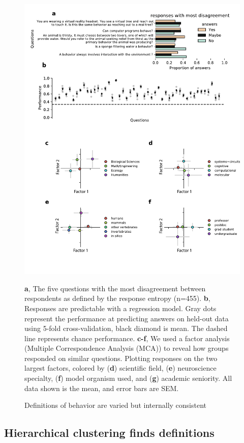 \documentclass[a4paper, 11pt]{article}
\begin{document}
\begin{figure}
\centerline{\includegraphics[width=\textwidth]{fig1.pdf}}
\caption{Definitions of behavior are varied but internally consistent} \textbf{a}, The five questions with the most disagreement between respondents as defined by the response entropy (n=455). \textbf{b}, Responses are predictable with a regression model. Gray dots represent the performance at predicting answers on held-out data using 5-fold cross-validation, black diamond is mean. The dashed line represents chance performance. \textbf{c-f}, We used a factor analysis (Multiple Correspondence Analysis (MCA)) to reveal how groups responded on similar questions. Plotting responses on the two largest factors, colored by (\textbf{d}) scientific field, (\textbf{e}) neuroscience specialty, (\textbf{f}) model organism used, and (\textbf{g}) academic seniority. All data shown is the mean, and error bars are SEM.
\end{figure}

\subsection*{Hierarchical clustering finds definitions}
\end{document}
